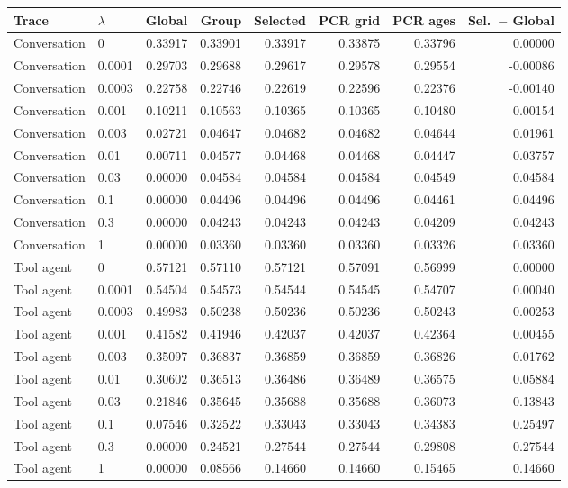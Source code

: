 \begin{tabular}{llrrrrrr}
\toprule
Trace & $\lambda$ & Global & Group & Selected & PCR grid & PCR ages & Sel.\ $-$ Global\\
\midrule
Conversation & 0 & 0.33917 & 0.33901 & 0.33917 & 0.33875 & 0.33796 & 0.00000\\
Conversation & 0.0001 & 0.29703 & 0.29688 & 0.29617 & 0.29578 & 0.29554 & -0.00086\\
Conversation & 0.0003 & 0.22758 & 0.22746 & 0.22619 & 0.22596 & 0.22376 & -0.00140\\
Conversation & 0.001 & 0.10211 & 0.10563 & 0.10365 & 0.10365 & 0.10480 & 0.00154\\
Conversation & 0.003 & 0.02721 & 0.04647 & 0.04682 & 0.04682 & 0.04644 & 0.01961\\
Conversation & 0.01 & 0.00711 & 0.04577 & 0.04468 & 0.04468 & 0.04447 & 0.03757\\
Conversation & 0.03 & 0.00000 & 0.04584 & 0.04584 & 0.04584 & 0.04549 & 0.04584\\
Conversation & 0.1 & 0.00000 & 0.04496 & 0.04496 & 0.04496 & 0.04461 & 0.04496\\
Conversation & 0.3 & 0.00000 & 0.04243 & 0.04243 & 0.04243 & 0.04209 & 0.04243\\
Conversation & 1 & 0.00000 & 0.03360 & 0.03360 & 0.03360 & 0.03326 & 0.03360\\
\midrule
Tool agent & 0 & 0.57121 & 0.57110 & 0.57121 & 0.57091 & 0.56999 & 0.00000\\
Tool agent & 0.0001 & 0.54504 & 0.54573 & 0.54544 & 0.54545 & 0.54707 & 0.00040\\
Tool agent & 0.0003 & 0.49983 & 0.50238 & 0.50236 & 0.50236 & 0.50243 & 0.00253\\
Tool agent & 0.001 & 0.41582 & 0.41946 & 0.42037 & 0.42037 & 0.42364 & 0.00455\\
Tool agent & 0.003 & 0.35097 & 0.36837 & 0.36859 & 0.36859 & 0.36826 & 0.01762\\
Tool agent & 0.01 & 0.30602 & 0.36513 & 0.36486 & 0.36489 & 0.36575 & 0.05884\\
Tool agent & 0.03 & 0.21846 & 0.35645 & 0.35688 & 0.35688 & 0.36073 & 0.13843\\
Tool agent & 0.1 & 0.07546 & 0.32522 & 0.33043 & 0.33043 & 0.34383 & 0.25497\\
Tool agent & 0.3 & 0.00000 & 0.24521 & 0.27544 & 0.27544 & 0.29808 & 0.27544\\
Tool agent & 1 & 0.00000 & 0.08566 & 0.14660 & 0.14660 & 0.15465 & 0.14660\\

\end{tabular}
